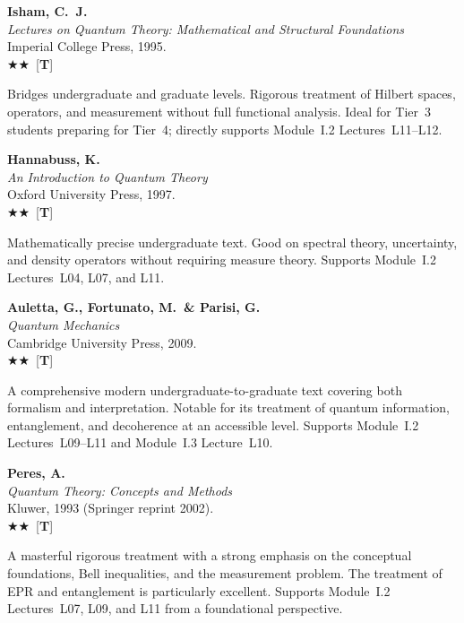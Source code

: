 \documentclass[11pt,a4paper]{article}
\newcommand{\recommended}{$\bigstar\bigstar$}
\newenvironment{bibentry}[1]{\begin{tcolorbox}[entrybox=#1,top=4pt,bottom=4pt]}{\end{tcolorbox}\smallskip}
\begin{document}
\begin{bibentry}{t3light}
\textbf{Isham, C.~J.}\\
\textit{Lectures on Quantum Theory: Mathematical and Structural Foundations}\\
Imperial College Press, 1995.\\[3pt]
\recommended\ [\textbf{T}]\\[3pt]
\begin{tcolorbox}[annotbox]
Bridges undergraduate and graduate levels. Rigorous treatment of Hilbert spaces,
operators, and measurement without full functional analysis. Ideal for Tier~3
students preparing for Tier~4; directly supports Module~I.2 Lectures~L11--L12.
\end{tcolorbox}
\end{bibentry}

\begin{bibentry}{t3light}
\textbf{Hannabuss, K.}\\
\textit{An Introduction to Quantum Theory}\\
Oxford University Press, 1997.\\[3pt]
\recommended\ [\textbf{T}]\\[3pt]
\begin{tcolorbox}[annotbox]
Mathematically precise undergraduate text. Good on spectral theory, uncertainty,
and density operators without requiring measure theory. Supports Module~I.2
Lectures~L04, L07, and L11.
\end{tcolorbox}
\end{bibentry}

\begin{bibentry}{t3light}
\textbf{Auletta, G., Fortunato, M.\ \& Parisi, G.}\\
\textit{Quantum Mechanics}\\
Cambridge University Press, 2009.\\[3pt]
\recommended\ [\textbf{T}]\\[3pt]
\begin{tcolorbox}[annotbox]
A comprehensive modern undergraduate-to-graduate text covering both formalism and
interpretation. Notable for its treatment of quantum information, entanglement, and
decoherence at an accessible level. Supports Module~I.2 Lectures~L09--L11 and
Module~I.3 Lecture~L10.
\end{tcolorbox}
\end{bibentry}

\begin{bibentry}{t3light}
\textbf{Peres, A.}\\
\textit{Quantum Theory: Concepts and Methods}\\
Kluwer, 1993 (Springer reprint 2002).\\[3pt]
\recommended\ [\textbf{T}]\\[3pt]
\begin{tcolorbox}[annotbox]
A masterful rigorous treatment with a strong emphasis on the conceptual
foundations, Bell inequalities, and the measurement problem. The treatment of
EPR and entanglement is particularly excellent. Supports Module~I.2 Lectures~L07,
L09, and L11 from a foundational perspective.
\end{tcolorbox}
\end{bibentry}
\end{document}
